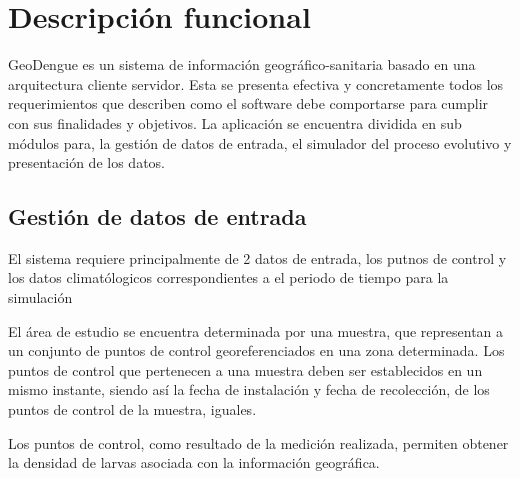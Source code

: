 \section{Descripción funcional}
GeoDengue es un sistema de información geográfico-sanitaria basado en una arquitectura cliente
servidor. Esta se presenta efectiva y concretamente todos los requerimientos que describen como el
software debe comportarse para cumplir con sus finalidades y objetivos. La aplicación se encuentra
dividida en sub módulos para, la gestión de datos de entrada, el simulador del proceso evolutivo y
presentación de los datos.


\subsection{Gestión de datos de entrada}
El sistema requiere principalmente de 2 datos de entrada, los putnos de control y los datos
climatólogicos correspondientes a el periodo de tiempo para la simulación

El área de estudio se encuentra determinada por una muestra, que representan a un conjunto de
puntos de control georeferenciados en una zona determinada. Los puntos de control que pertenecen a
una muestra deben ser establecidos en un mismo instante, siendo así la fecha de instalación y
fecha de recolección, de los puntos de control de la muestra, iguales.


Los puntos de control, como resultado de la medición realizada, permiten obtener la densidad de
larvas asociada con la información geográfica.
